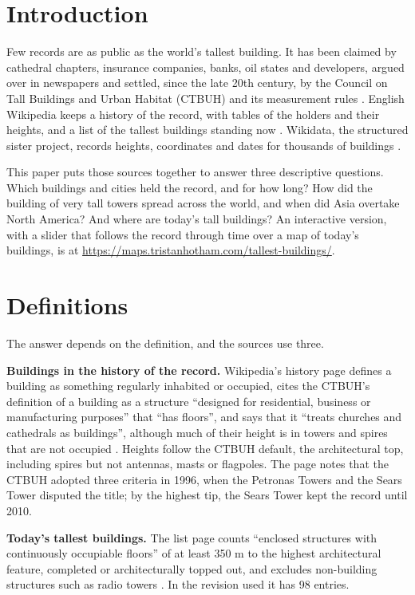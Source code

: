 \documentclass[11pt,a4paper]{article}
\begin{document}
\section{Introduction}
Few records are as public as the world's tallest building. It has been claimed by cathedral chapters, insurance companies, banks, oil states and developers, argued over in newspapers and settled, since the late 20th century, by the Council on Tall Buildings and Urban Habitat (CTBUH) and its measurement rules \citep{ctbuh}. English Wikipedia keeps a history of the record, with tables of the holders and their heights, and a list of the tallest buildings standing now \citep{wphist,wplist}. Wikidata, the structured sister project, records heights, coordinates and dates for thousands of buildings \citep{wikidata}.

This paper puts those sources together to answer three descriptive questions. Which buildings and cities held the record, and for how long? How did the building of very tall towers spread across the world, and when did Asia overtake North America? And where are today's tall buildings? An interactive version, with a slider that follows the record through time over a map of today's buildings, is at \url{https://maps.tristanhotham.com/tallest-buildings/}.

\section{Definitions}
The answer depends on the definition, and the sources use three.

\textbf{Buildings in the history of the record.} Wikipedia's history page defines a building as something regularly inhabited or occupied, cites the CTBUH's definition of a building as a structure ``designed for residential, business or manufacturing purposes'' that ``has floors'', and says that it ``treats churches and cathedrals as buildings'', although much of their height is in towers and spires that are not occupied \citep{wphist}. Heights follow the CTBUH default, the architectural top, including spires but not antennas, masts or flagpoles. The page notes that the CTBUH adopted three criteria in 1996, when the Petronas Towers and the Sears Tower disputed the title; by the highest tip, the Sears Tower kept the record until 2010.

\textbf{Today's tallest buildings.} The list page counts ``enclosed structures with continuously occupiable floors'' of at least 350 m to the highest architectural feature, completed or architecturally topped out, and excludes non-building structures such as radio towers \citep{wplist}. In the revision used it has 98 entries.
\end{document}
